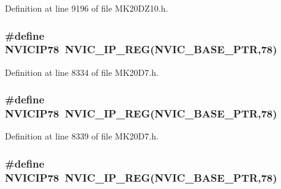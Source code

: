 Definition at line 9196 of file M\+K20\+D\+Z10.\+h.

\subsubsection[{\texorpdfstring{N\+V\+I\+C\+I\+P78}{NVICIP78}}]{\setlength{\rightskip}{0pt plus 5cm}\#define N\+V\+I\+C\+I\+P78~{\bf N\+V\+I\+C\+\_\+\+I\+P\+\_\+\+R\+EG}({\bf N\+V\+I\+C\+\_\+\+B\+A\+S\+E\+\_\+\+P\+TR},78)}\hypertarget{group___n_v_i_c___register___accessor___macros_ga9ac350ef6ba63036c5f0842df0c52867}{}\label{group___n_v_i_c___register___accessor___macros_ga9ac350ef6ba63036c5f0842df0c52867}


Definition at line 8334 of file M\+K20\+D7.\+h.

\subsubsection[{\texorpdfstring{N\+V\+I\+C\+I\+P78}{NVICIP78}}]{\setlength{\rightskip}{0pt plus 5cm}\#define N\+V\+I\+C\+I\+P78~{\bf N\+V\+I\+C\+\_\+\+I\+P\+\_\+\+R\+EG}({\bf N\+V\+I\+C\+\_\+\+B\+A\+S\+E\+\_\+\+P\+TR},78)}\hypertarget{group___n_v_i_c___register___accessor___macros_ga9ac350ef6ba63036c5f0842df0c52867}{}\label{group___n_v_i_c___register___accessor___macros_ga9ac350ef6ba63036c5f0842df0c52867}


Definition at line 8339 of file M\+K20\+D7.\+h.

\subsubsection[{\texorpdfstring{N\+V\+I\+C\+I\+P78}{NVICIP78}}]{\setlength{\rightskip}{0pt plus 5cm}\#define N\+V\+I\+C\+I\+P78~{\bf N\+V\+I\+C\+\_\+\+I\+P\+\_\+\+R\+EG}({\bf N\+V\+I\+C\+\_\+\+B\+A\+S\+E\+\_\+\+P\+TR},78)}\hypertarget{group___n_v_i_c___register___accessor___macros_ga9ac350ef6ba63036c5f0842df0c52867}{}\label{group___n_v_i_c___register___accessor___macros_ga9ac350ef6ba63036c5f0842df0c52867}


